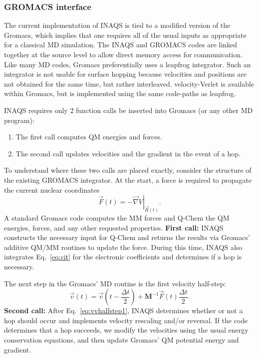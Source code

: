 \documentclass[journal=jctcce,manuscript=article,layout=traditional]{achemso}
\newcommand{\mat}[1]{\ensuremath{\mathbf{#1}}}
\newcommand{\refeq}[1]{Eq.~\ref{#1}}
\begin{document}
\subsubsection{GROMACS interface}
The current implementation of INAQS is tied to a modified version of the Gromacs, which implies that one requires all of the usual inputs as appropriate for a classical MD simulation.
The INAQS and GROMACS codes are linked together at the source level to allow direct memory access for communication.
Like many MD codes\cite{allentildesley1989}, Gromacs preferentially uses a leapfrog integrator.
Such an integrator is not usable for surface hopping because velocities and positions are not obtained for the same time, but rather interleaved.
velocity-Verlet is available within Gromacs, but is implemented using the same code-paths as leapfrog.
%


INAQS requires only 2 function calls be inserted into Gromacs (or any other MD program):
\begin{enumerate}
    \item The first call computes QM energies and forces.
    \item The second call updates velocities and the gradient in the event of a hop.
\end{enumerate}

%


To understand where these two calls are placed exactly, consider the structure of the existing GROMACS integrator.
At the start, a force is required to propagate the current nuclear coordinates
\begin{equation}
    \vec{F}(t) = {\left.-\vec{\nabla} V\right|}_{\vec{R}(t)}.
\end{equation}
A standard Gromacs code computes the MM forces and Q-Chem the QM energies, forces, and any other requested properties. {\bf First call:} INAQS constructs the necessary input for Q-Chem and returns the results via Gromacs' additive QM/MM routines to update the force. During this time, INAQS also integrates \refeq{eq:cit} for the electronic coefficients and determines if a hop is necessary. 

The next step in the Gromacs' MD routine is the first velocity half-step:
\begin{equation}\label{eq:vvhalfstep1}
    \vec{v}(t) = \vec{v}(t-\frac{\Delta t}{2}) + \mat{M}^{-1}\vec{F}(t)\frac{\Delta t}{2}.
\end{equation}
{\bf Second call:} After \refeq{eq:vvhalfstep1}, INAQS determines whether or not a hop should occur and implements velocity rescaling and/or reversal.  If the code determines that a hop succeeds, we modify the velocities using the usual energy conservation equations, and then update Gromacs' QM potential energy and gradient.
\end{document}
